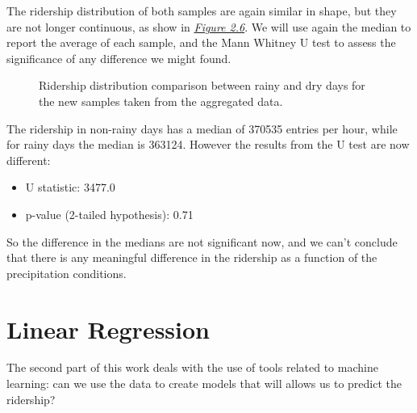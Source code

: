 \documentclass[a4paper,12pt,english]{sphinxmanual}
\begin{document}
The ridership distribution of both samples are again similar in shape, but they are not
longer continuous, as show in {\hyperref[section1:figure26]{\emph{Figure 2.6}}}. We will use again the median
to report the average of each sample, and the Mann Whitney U test to assess the significance
of any difference we might found.
\begin{figure}[htbp]
\centering
\capstart

\caption{Ridership distribution comparison between rainy and dry days for the new samples
taken from the aggregated data.}\label{section1:figure26}\end{figure}

The ridership in non-rainy days has a median of 370535 entries per hour, while for rainy
days the median is 363124. However the results from the U test are now different:
\begin{itemize}
\item {} 
U statistic: 3477.0

\item {} 
p-value (2-tailed hypothesis): 0.71

\end{itemize}

So the difference in the medians are not significant now, and we can't conclude that
there is any meaningful difference in the ridership as a function of the precipitation
conditions.


\chapter{Linear Regression}
\label{section2:linear-regression}\label{section2::doc}
The second part of this work deals with the use of tools related to machine
learning: can we use the data to create models that will allows us to predict
the ridership?
\end{document}
